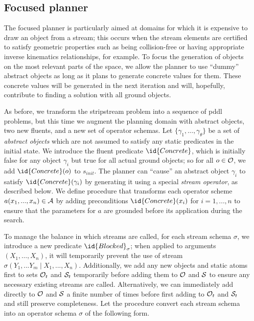 \documentclass[letterpaper]{article} %
\theoremstyle{plain}\newtheorem{thm}{Theorem}
\theoremstyle{definition}\newtheorem{defn}{Definition}
\theoremstyle{plain}\newtheorem{lem}{Lemma}
\theoremstyle{plain}\newtheorem{cor}{Corollary}
\newcommand{\algname}{{\sc strips}tream}
\newcommand{\pddl}{{\sc pddl}}
\begin{document}
\subsection{Focused planner}  

The focused planner is particularly aimed
at domains for which it is expensive to draw an object from a stream;
this occurs when the stream elements are certified to satisfy
geometric properties such as being collision-free or having
appropriate inverse kinematics relationships, for example.  To focus
the generation of objects on the most relevant parts of the space, we
allow the planner to use ``dummy'' abstract objects as long as it
plans to generate concrete values for them.  These concrete values
will be generated in the next iteration and will, hopefully,
contribute to finding a solution with all ground objects.

As before, we transform the \algname{} problem into a sequence of
\pddl{} problems, but this time we augment the planning domain with
abstract objects, two new fluents, and a new set of operator schemas.  
Let $\{\gamma_1, ..., \gamma_\theta\}$ be a set of {\em
  abstract objects} which are not assumed to satisfy any static
predicates in the initial state. %
We introduce the fluent predicate $\id{Concrete}$, which is initially
false for any object $\gamma_i$ but true for all actual ground
objects; so for all $o \in {\cal O}$, we add $\id{Concrete}(o)$ to
$s_{init}$.  The planner can ``cause'' an abstract object $\gamma_i$ to
satisfy $\id{Concrete}(\gamma_i)$ by generating it using a special
{\em stream operator}, as described below.  
We define procedure 
that transforms each operator scheme $a(x_1, ..., x_n) \in {\cal A}$
by adding preconditions $\id{Concrete}(x_i)$ for $i = 1, ..., n$ to 
ensure that the parameters for $a$ are grounded before its
application during the search. 

To manage the balance in which streams are called,
for each stream schema $\sigma$, we introduce a new predicate
$\id{Blocked}_\sigma$; when applied to arguments
$(X_1, \ldots, X_n)$, it will temporarily prevent the use of stream
$\sigma(Y_1, ... Y_m \mid X_1, ..., X_n)$. Additionally, we add any new objects
and static atoms first to sets ${\cal O}_t$ and ${\cal S}_t$ temporarily before adding 
them to ${\cal O}$ and ${\cal S}$ to ensure any necessary existing streams
are called. Alternatively, we can immediately add directly to ${\cal O}$ and ${\cal S}$
a finite number of times before first adding to ${\cal O}_t$ and ${\cal S}_t$ and
still preserve completeness.
Let the procedure
 convert each stream schema into an operator
schema $\sigma$ of the following form.
\end{document}
